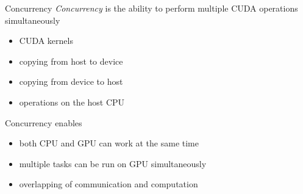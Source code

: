 
\begin{frame}[fragile]{}
    \begin{info}{Concurrency}
        \emph{Concurrency} is the ability to perform multiple CUDA operations simultaneously
        \begin{itemize}
            \item CUDA kernels
            \item copying from host to device
            \item copying from device to host
            \item operations on the host CPU
        \end{itemize}
    \end{info}

    \begin{info}{Concurrency enables}
        \begin{itemize}
            \item both CPU and GPU can work at the same time
            \item multiple tasks can be run on GPU simultaneously
            \item overlapping of communication and computation
        \end{itemize}
    \end{info}

\end{frame}

